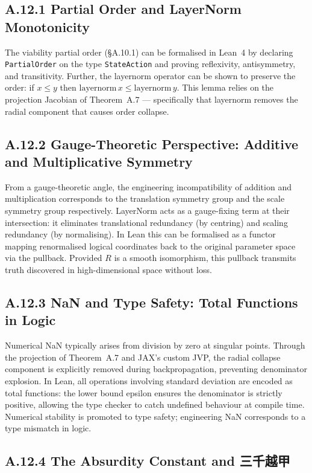 \documentclass[11pt,a4paper]{article}
\theoremstyle{definition}
\theoremstyle{remark}
\begin{document}
\subsection{A.12.1 Partial Order and LayerNorm Monotonicity}

The viability partial order (\S A.10.1) can be formalised in Lean~4 by declaring \texttt{PartialOrder} on the type \texttt{StateAction} and proving reflexivity, antisymmetry, and transitivity. Further, the layernorm operator can be shown to preserve the order: if $x \leq y$ then $\mathrm{layernorm}\, x \leq \mathrm{layernorm}\, y$. This lemma relies on the projection Jacobian of Theorem~A.7 --- specifically that layernorm removes the radial component that causes order collapse.


\subsection{A.12.2 Gauge-Theoretic Perspective: Additive and Multiplicative Symmetry}

From a gauge-theoretic angle, the engineering incompatibility of addition and multiplication corresponds to the translation symmetry group and the scale symmetry group respectively. LayerNorm acts as a gauge-fixing term at their intersection: it eliminates translational redundancy (by centring) and scaling redundancy (by normalising). In Lean this can be formalised as a functor mapping renormalised logical coordinates back to the original parameter space via the pullback. Provided $R$ is a smooth isomorphism, this pullback transmits truth discovered in high-dimensional space without loss.


\subsection{A.12.3 NaN and Type Safety: Total Functions in Logic}

Numerical NaN typically arises from division by zero at singular points. Through the projection of Theorem~A.7 and JAX's custom JVP, the radial collapse component is explicitly removed during backpropagation, preventing denominator explosion. In Lean, all operations involving standard deviation are encoded as total functions: the lower bound epsilon ensures the denominator is strictly positive, allowing the type checker to catch undefined behaviour at compile time. Numerical stability is promoted to type safety; engineering NaN corresponds to a type mismatch in logic.


\subsection{A.12.4 The Absurdity Constant and 三千越甲}
\end{document}
